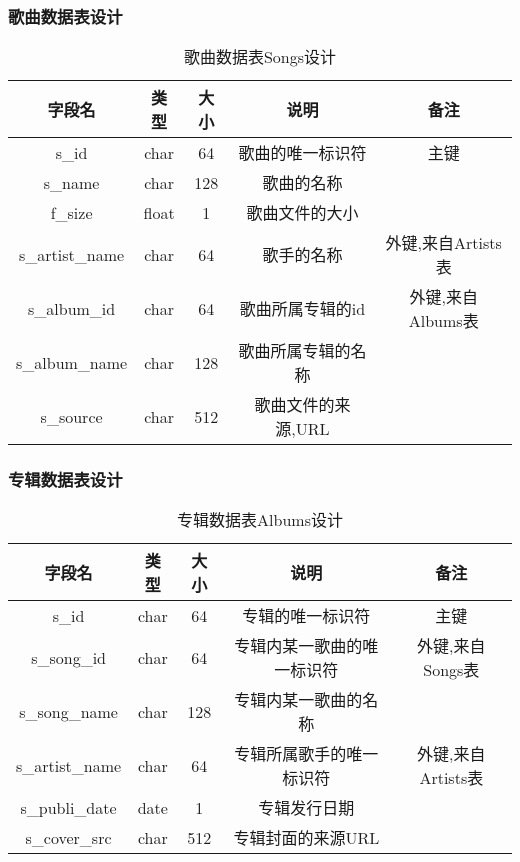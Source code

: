 \subsubsection{歌曲数据表设计}
\begin{table}[htbp]
	\centering
	\caption{歌曲数据表Songs设计} \label{tab:songs-database}
	\begin{tabular}{|c|c|c|c|c|}
		\hline
		字段名 & 类型 & 大小 & 说明 & 备注 \\
		\hline
		s\_id & char & 64 & 歌曲的唯一标识符 & 主键\\
		\hline
		s\_name & char & 128 & 歌曲的名称 &  \\
		\hline
		f\_size & float & 1 & 歌曲文件的大小 & \\
		\hline
		s\_artist\_name & char & 64 & 歌手的名称 & 外键,来自Artists表 \\
		\hline
		s\_album\_id & char & 64 & 歌曲所属专辑的id & 外键,来自Albums表 \\
		\hline
		s\_album\_name & char & 128 & 歌曲所属专辑的名称 & \\
		\hline
		s\_source & char & 512 & 歌曲文件的来源,URL & \\
		\hline
	\end{tabular}
\end{table}

\subsubsection{专辑数据表设计}
\begin{table}[htbp]
	\centering
	\caption{专辑数据表Albums设计} \label{tab:albums-database}
	\begin{tabular}{|c|c|c|c|c|}
		\hline
		字段名 & 类型 & 大小 & 说明 & 备注 \\
		\hline
		s\_id & char & 64 & 专辑的唯一标识符 & 主键 \\
		\hline
		s\_song\_id & char & 64 & 专辑内某一歌曲的唯一标识符 & 外键,来自Songs表 \\
		\hline
		s\_song\_name & char & 128 & 专辑内某一歌曲的名称 & \\
		\hline
		s\_artist\_name & char & 64 & 专辑所属歌手的唯一标识符 & 外键,来自Artists表 \\
		\hline
		s\_publi\_date & date & 1 & 专辑发行日期 & \\
		\hline
		s\_cover\_src & char & 512 & 专辑封面的来源URL & \\
		\hline
	\end{tabular}
\end{table}

